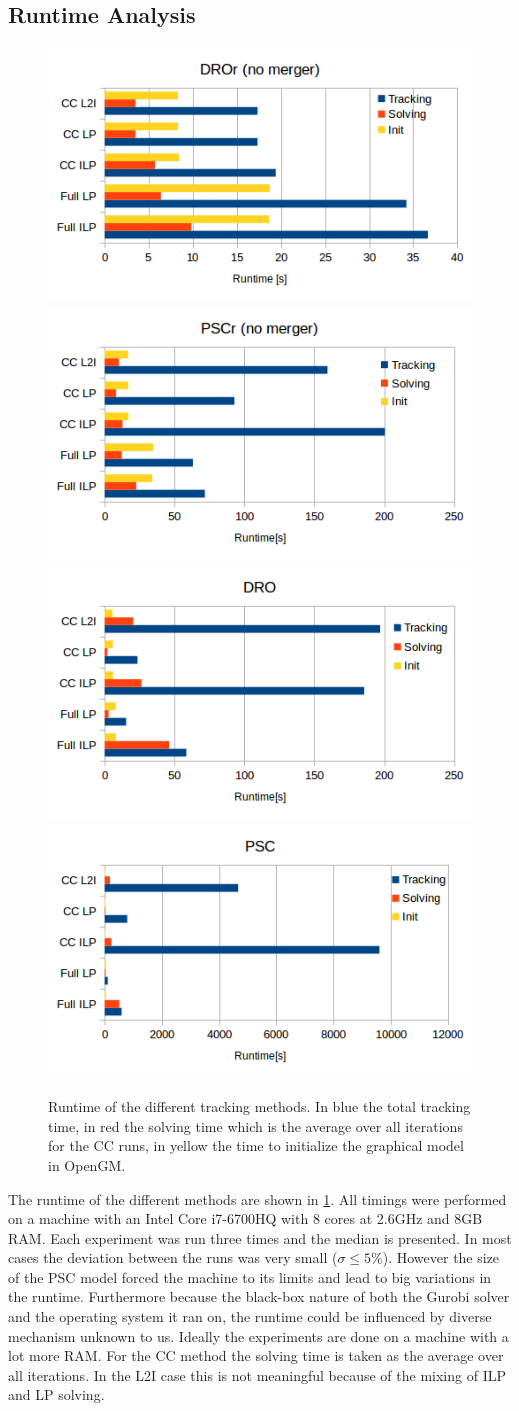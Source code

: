 \documentclass[10pt,twocolumn,letterpaper]{article}
\begin{document}
\subsection{Runtime Analysis}

\begin{figure}[t]
  \centering
  \includegraphics[width=.45\linewidth]{dror.png}
  \includegraphics[width=.45\linewidth]{pscr.png}
  \includegraphics[width=.45\linewidth]{dro.png}
  \includegraphics[width=.45\linewidth]{psc.png}
  \caption{Runtime of the different tracking methods. In blue the total tracking time, in red the solving time which is the average over all iterations for the CC runs, in yellow the time to initialize the graphical model in OpenGM.}
  \label{fig:runtime}
\end{figure}

    The runtime of the different methods are shown in \cref{fig:runtime}. All timings were performed on a machine with an Intel Core i7-6700HQ with 8 cores at 2.6GHz and 8GB RAM. Each experiment was run three times and the median is presented. In most cases the deviation between the runs was very small ($\sigma \leq 5\%$). However the size of the PSC model forced the machine to its limits and lead to big variations in the runtime. Furthermore because the black-box nature of both the Gurobi solver and the operating system it ran on, the runtime could be influenced by diverse mechanism unknown to us. Ideally the experiments are done on a machine with a lot more RAM. For the CC method the solving time is taken as the average over all iterations. In the L2I case this is not meaningful because of the mixing of ILP and LP solving.
\end{document}
